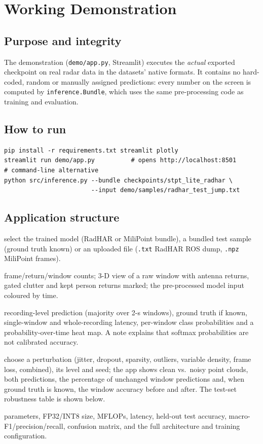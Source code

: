 \chapter{Working Demonstration}
\label{ch:demo}

\section{Purpose and integrity}
The demonstration (\texttt{demo/app.py}, Streamlit) executes the \emph{actual}
exported checkpoint on real radar data in the datasets' native formats. It
contains no hard-coded, random or manually assigned predictions: every number on
the screen is computed by \texttt{inference.Bundle}, which uses the same
pre-processing code as training and evaluation.

\section{How to run}
\begin{lstlisting}[numbers=none]
pip install -r requirements.txt streamlit plotly
streamlit run demo/app.py          # opens http://localhost:8501
# command-line alternative
python src/inference.py --bundle checkpoints/stpt_lite_radhar \
                        --input demo/samples/radhar_test_jump.txt
\end{lstlisting}

\section{Application structure}
\begin{description}[nosep]
\item[Sidebar] select the trained model (RadHAR or MiliPoint bundle), a bundled
  test sample (ground truth known) or an uploaded file (\texttt{.txt} RadHAR ROS
  dump, \texttt{.npz} MiliPoint frames).
\item[1 Input \& pre-processing] frame/return/window counts; 3-D view of a raw window
  with antenna returns, gated clutter and kept person returns marked; the
  pre-processed model input coloured by time.
\item[2 Recognition] recording-level prediction (majority over 2-s windows),
  ground truth if known, single-window and whole-recording latency, per-window
  class probabilities and a probability-over-time heat map. A note explains that
  softmax probabilities are not calibrated accuracy.
\item[3 Noise robustness] choose a perturbation (jitter, dropout, sparsity,
  outliers, variable density, frame loss, combined), its level and seed; the app
  shows clean vs.\ noisy point clouds, both predictions, the percentage of
  unchanged window predictions and, when ground truth is known, the window
  accuracy before and after. The test-set robustness table is shown below.
\item[4 Model \& results] parameters, FP32/INT8 size, MFLOPs, latency, held-out
  test accuracy, macro-F1/precision/recall, confusion matrix, and the full
  architecture and training configuration.
\end{description}

